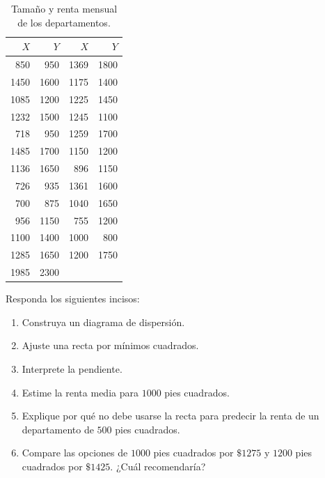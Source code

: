 \begin{table}[H]
\centering
\small
\begin{tabular}{r r@{\qquad\qquad}r r}
$X$ & $Y$ & $X$ & $Y$ \\ \hline
850 & 950 & 1369 & 1800 \\
1450 & 1600 & 1175 & 1400 \\
1085 & 1200 & 1225 & 1450 \\
1232 & 1500 & 1245 & 1100 \\
718 & 950 & 1259 & 1700 \\
1485 & 1700 & 1150 & 1200 \\
1136 & 1650 & 896 & 1150 \\
726 & 935 & 1361 & 1600 \\
700 & 875 & 1040 & 1650 \\
956 & 1150 & 755 & 1200 \\
1100 & 1400 & 1000 & 800 \\
1285 & 1650 & 1200 & 1750 \\
1985 & 2300 & & \\
\end{tabular}
\caption{Tamaño y renta mensual de los departamentos.}
\end{table}

Responda los siguientes incisos:
\begin{enumerate}
    \item[\textbf{a)}] Construya un diagrama de dispersión.
    \item[\textbf{b)}] Ajuste una recta por mínimos cuadrados.
    \item[\textbf{c)}] Interprete la pendiente.
    \item[\textbf{d)}] Estime la renta media para $1000$ pies cuadrados.
    \item[\textbf{e)}] Explique por qué no debe usarse la recta para predecir la renta de un departamento de $500$ pies cuadrados.
    \item[\textbf{f)}] Compare las opciones de $1000$ pies cuadrados por $\$1275$ y $1200$ pies cuadrados por $\$1425$. ¿Cuál recomendaría?
\end{enumerate}

